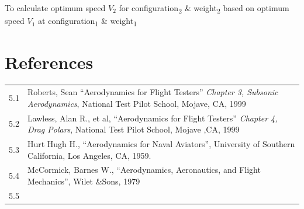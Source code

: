 \documentclass[
]{book}
\begin{document}
To calculate optimum speed \(V_2\) for configuration\textsubscript{2} \& weight\textsubscript{2} based on optimum speed \(V_1\) at configuration\textsubscript{1} \& weight\textsubscript{1}

\hypertarget{references}{%
\section{References}\label{references}}

\begin{longtable}[]{@{}ll@{}}
\toprule
\endhead
\begin{minipage}[t]{0.06\columnwidth}\raggedright
5.1\strut
\end{minipage} & \begin{minipage}[t]{0.88\columnwidth}\raggedright
Roberts, Sean ``Aerodynamics for Flight Testers'' \emph{Chapter 3, Subsonic Aerodynamics}, National Test Pilot School, Mojave, CA, 1999\strut
\end{minipage}\tabularnewline
\begin{minipage}[t]{0.06\columnwidth}\raggedright
5.2\strut
\end{minipage} & \begin{minipage}[t]{0.88\columnwidth}\raggedright
Lawless, Alan R., et al, ``Aerodynamics for Flight Testers'' \emph{Chapter 4, Drag Polars}, National Test Pilot School, Mojave ,CA, 1999\strut
\end{minipage}\tabularnewline
\begin{minipage}[t]{0.06\columnwidth}\raggedright
5.3\strut
\end{minipage} & \begin{minipage}[t]{0.88\columnwidth}\raggedright
Hurt Hugh H., ``Aerodynamics for Naval Aviators'', University of Southern California, Los Angeles, CA, 1959.\strut
\end{minipage}\tabularnewline
\begin{minipage}[t]{0.06\columnwidth}\raggedright
5.4\strut
\end{minipage} & \begin{minipage}[t]{0.88\columnwidth}\raggedright
McCormick, Barnes W., ``Aerodynamics, Aeronautics, and Flight Mechanics'', Wilet \&Sons, 1979\strut
\end{minipage}\tabularnewline
\begin{minipage}[t]{0.06\columnwidth}\raggedright
5.5\strut
\end{minipage} & \begin{minipage}[t]{0.88\columnwidth}\raggedright

\end{minipage}
\end{longtable}
\end{document}
